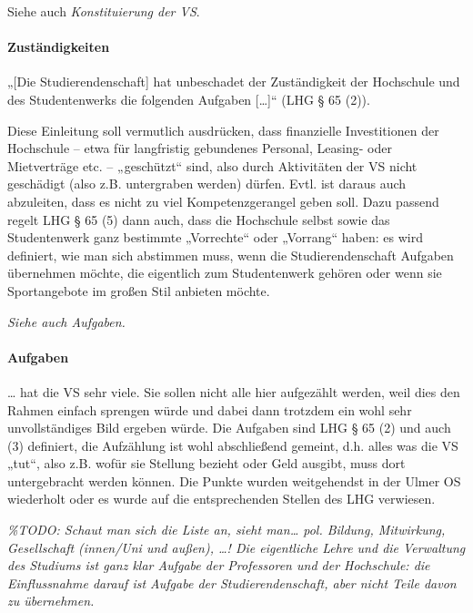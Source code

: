 \documentclass[
10pt,
a4paper,
twoside,								%
titlepage=false,							%
draft=false								%
]{scrartcl}
\begin{document}
Siehe auch \emph{Konstituierung der VS}.



\paragraph{Zuständigkeiten\label{Glossar:Zuständigkeiten}}

„[Die Studierendenschaft] hat unbeschadet der Zuständigkeit der Hochschule und des Studentenwerks die folgenden Aufgaben […]“ (LHG § 65 (2)).

Diese Einleitung soll vermutlich ausdrücken, dass finanzielle Investitionen der Hochschule – etwa für langfristig gebundenes Personal, Leasing- oder Mietverträge etc. – „geschützt“ sind, also durch Aktivitäten der VS nicht geschädigt (also z.B. untergraben werden) dürfen. Evtl. ist daraus auch abzuleiten, dass es nicht zu viel Kompetenzgerangel geben soll. Dazu passend regelt LHG § 65 (5) dann auch, dass die Hochschule selbst sowie das Studentenwerk ganz bestimmte „Vorrechte“ oder „Vorrang“ haben: es wird definiert, wie man sich abstimmen muss, wenn die Studierendenschaft Aufgaben übernehmen möchte, die eigentlich zum Studentenwerk gehören oder wenn sie Sportangebote im großen Stil anbieten möchte.

\emph{Siehe auch Aufgaben.}


\paragraph{Aufgaben}

… hat die VS sehr viele. Sie sollen nicht alle hier aufgezählt werden, weil dies den Rahmen einfach sprengen würde und dabei dann trotzdem ein wohl sehr unvollständiges Bild ergeben würde. Die Aufgaben sind LHG § 65 (2) und auch (3) definiert, die Aufzählung ist wohl abschließend gemeint, d.h. alles was die VS „tut“, also z.B. wofür sie Stellung bezieht oder Geld ausgibt, muss dort untergebracht werden können. Die Punkte wurden weitgehendst in der Ulmer OS wiederholt oder es wurde auf die entsprechenden Stellen des LHG verwiesen.

\textit{\%TODO: Schaut man sich die Liste an, sieht man… pol. Bildung, Mitwirkung, Gesellschaft (innen/Uni und außen), …! Die eigentliche Lehre und die Verwaltung des Studiums ist ganz klar Aufgabe der Professoren und der Hochschule: die Einflussnahme darauf ist Aufgabe der Studierendenschaft, aber nicht Teile davon zu übernehmen.}
\end{document}
